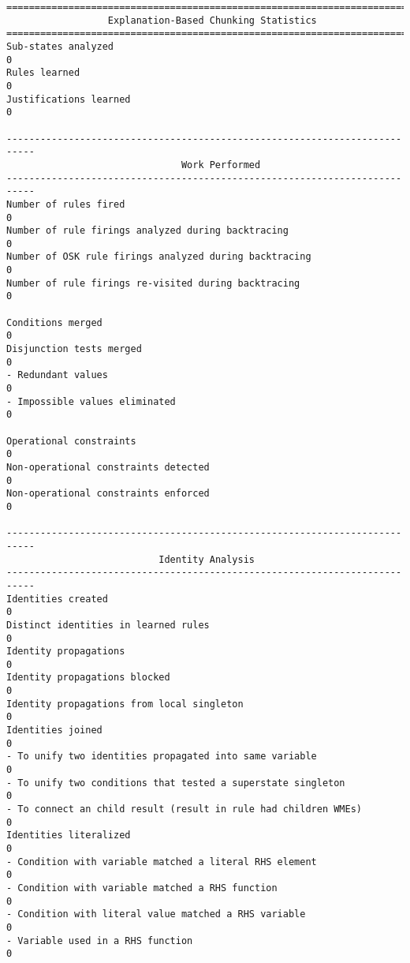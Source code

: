 \begin{center}
{\small
\begin{verbatim}
===========================================================================
                  Explanation-Based Chunking Statistics
===========================================================================
Sub-states analyzed                                                    0
Rules learned                                                          0
Justifications learned                                                 0

---------------------------------------------------------------------------
                               Work Performed
---------------------------------------------------------------------------
Number of rules fired                                                  0
Number of rule firings analyzed during backtracing                     0
Number of OSK rule firings analyzed during backtracing                 0
Number of rule firings re-visited during backtracing                   0

Conditions merged                                                      0
Disjunction tests merged                                               0
- Redundant values                                                     0
- Impossible values eliminated                                         0

Operational constraints                                                0
Non-operational constraints detected                                   0
Non-operational constraints enforced                                   0

---------------------------------------------------------------------------
                           Identity Analysis
---------------------------------------------------------------------------
Identities created                                                     0
Distinct identities in learned rules                                   0
Identity propagations                                                  0
Identity propagations blocked                                          0
Identity propagations from local singleton                             0
Identities joined                                                      0
- To unify two identities propagated into same variable                0
- To unify two conditions that tested a superstate singleton           0
- To connect an child result (result in rule had children WMEs)        0
Identities literalized                                                 0
- Condition with variable matched a literal RHS element                0
- Condition with variable matched a RHS function                       0
- Condition with literal value matched a RHS variable                  0
- Variable used in a RHS function                                      0


\end{verbatim}}
\end{center}
